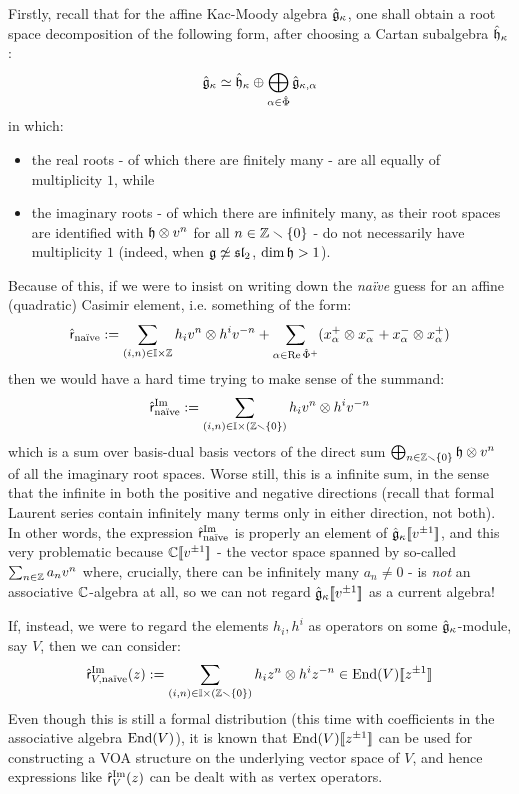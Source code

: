             Firstly, recall that for the affine Kac-Moody algebra $\hat{\mathfrak{g}}_{\kappa}$, one shall obtain a root space decomposition of the following form, after choosing a Cartan subalgebra $\hat{\mathfrak{h}}_{\kappa}$:
                $$\hat{\mathfrak{g}}_{\kappa} \simeq \hat{\mathfrak{h}}_{\kappa} \oplus \bigoplus_{\alpha \in \hat{\Phi}} \hat{\mathfrak{g}}_{\kappa, \alpha}$$
            in which:
            \begin{itemize}
                \item the real roots - of which there are finitely many - are all equally of multiplicity $1$, while
                \item the imaginary roots - of which there are infinitely many, as their root spaces are identified with $\h \tensor v^n$ for all $n \in \mathbb{Z} \smallsetminus \{0\}$ - do not necessarily have multiplicity $1$ (indeed, when $\mathfrak{g} \not \simeq \mathfrak{sl}_2$, $\dim \mathfrak{h} > 1$).
            \end{itemize}
            Because of this, if we were to insist on writing down the \textit{na\"ive} guess for an affine (quadratic) Casimir element, i.e. something of the form:
                $$\hat{\sfr}_{\text{na\"ive}} := \sum_{(i, n) \in \simpleroots \x \Z} h_i v^n \tensor h^i v^{-n} + \sum_{\alpha \in \Re \hat{\Phi}^+} (x_{\alpha}^+ \tensor x_{\alpha}^- + x_{\alpha}^- \tensor x_{\alpha}^+)$$
            then we would have a hard time trying to make sense of the summand:
                $$\hat{\sfr}_{\text{na\"ive}}^{\Im} := \sum_{(i, n) \in \simpleroots \x (\Z \setminus \{0\})} h_i v^n \tensor h^i v^{-n}$$
            which is a sum over basis-dual basis vectors of the direct sum $\bigoplus_{n \in \Z \setminus \{0\}} \h \tensor v^n$ of all the imaginary root spaces. Worse still, this is a  infinite sum, in the sense that the infinite in both the positive and negative directions (recall that formal Laurent series contain infinitely many terms only in either direction, not both). In other words, the expression $\hat{\mathsf{r}}_{\text{na\"ive}}^{\operatorname{Im}}$ is properly an element of $\hat{\mathfrak{g}}_{\kappa}[\![v^{\pm 1}]\!]$, and this very problematic because $\mathbb{C}[\![v^{\pm 1}]\!]$ - the vector space spanned by so-called  $\sum_{n \in \mathbb{Z}} a_n v^n$ where, crucially, there can be infinitely many $a_n \not = 0$ - is \textit{not} an associative $\mathbb{C}$-algebra at all, so we can not regard $\hat{\mathfrak{g}}_{\kappa}[\![v^{\pm 1}]\!]$ as a current algebra!

            If, instead, we were to regard the elements $h_i, h^i$ as operators on some $\hat{\mathfrak{g}}_{\kappa}$-module, say $V$, then we can consider:
                $$\hat{\sfr}_{V, \text{na\"ive}}^{\Im}(z) := \sum_{(i, n) \in \simpleroots \x (\Z \setminus \{0\})} h_i z^n \tensor h^i z^{-n} \in \End(V)[\![z^{\pm 1}]\!]$$
            Even though this is still a formal distribution (this time with coefficients in the associative algebra $\mathrm{End}(V)$), it is known that $\mathrm{End}(V)[\![z^{\pm 1}]\!]$ can be used for constructing a VOA structure on the underlying vector space of $V$, and hence expressions like $\hat{\mathsf{r}}_V^{\operatorname{Im}}(z)$ can be dealt with as vertex operators.

